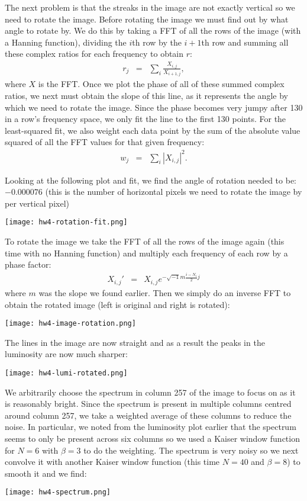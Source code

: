 \documentclass[12pt]{article}
\begin{document}
The next problem is that the streaks in the image are not exactly vertical so we need to rotate the image.
Before rotating the image we must find out by what angle to rotate by.
We do this by taking a FFT of all the rows of the image (with a Hanning function), dividing the $i$th row by the $i+1$th row and summing all these complex ratios for each frequency to obtain $r$:
\begin{eqnarray}
	r_j &=& \sum_i \frac{X_{i,j}}{X_{i+1,j}} , 
\end{eqnarray}
where $X$ is the FFT.
Once we plot the phase of all of these summed complex ratios, we next must obtain the slope of this line, as it represents the angle by which we need to rotate the image.
Since the phase becomes very jumpy after 130 in a row's frequency space, we only fit the line to the first 130 points.
For the least-squared fit, we also weight each data point by the sum of the absolute value squared of all the FFT values for that given frequency:
\begin{eqnarray}
	w_j &=& \sum_i |X_{i,j}|^2.
\end{eqnarray}

Looking at the following plot and fit, we find the angle of rotation needed to be: $-0.000076$ (this is the number of horizontal pixels we need to rotate the image by per vertical pixel)
\begin{center}
\texttt{[image: hw4-rotation-fit.png]}
\end{center}

To rotate the image we take the FFT of all the rows of the image again (this time with no Hanning function) and multiply each frequency of each row by a phase factor:
\begin{eqnarray}
	X_{i,j}' &=& X_{i,j} e^{-\sqrt{-1} m \frac{i - N_i}{2} j}
\end{eqnarray}
where $m$ was the slope we found earlier.
Then we simply do an inverse FFT to obtain the rotated image (left is original and right is rotated):
\begin{center}
\texttt{[image: hw4-image-rotation.png]}
\end{center}

The lines in the image are now straight and as a result the peaks in the luminosity are now much sharper:
\begin{center}
\texttt{[image: hw4-lumi-rotated.png]}
\end{center}

We arbitrarily choose the spectrum in column 257 of the image to focus on as it is reasonably bright.
Since the spectrum is present in multiple columns centred around column 257, we take a weighted average of these columns to reduce the noise.
In particular, we noted from the luminosity plot earlier that the spectrum seems to only be present across six columns so we used a Kaiser window function for $N=6$ with $\beta = 3$ to do the weighting.
The spectrum is very noisy so we next convolve it with another Kaiser window function (this time $N=40$ and $\beta = 8$) to smooth it and we find:
\begin{center}
\texttt{[image: hw4-spectrum.png]}
\end{center}
\end{document}
